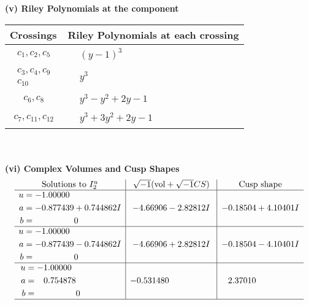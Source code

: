 \documentclass[1p]{elsarticle_modified}
\theoremstyle{definition}
\newcommand{\I}{\sqrt{-1}}
\begin{document}
\newpage\renewcommand{\arraystretch}{1}
\flushleft \textbf{(v) Riley Polynomials at the component}\newline \\
\begin{tabular}{m{50pt}|m{274pt}}
Crossings & \hspace{64pt}Riley Polynomials at each crossing \\
\hline $$\begin{aligned}c_{1},c_{2},c_{5}\end{aligned}$$&$\begin{aligned}
&(y-1)^3
\end{aligned}$\\
\hline $$\begin{aligned}c_{3},c_{4},c_{9}\\c_{10}\end{aligned}$$&$\begin{aligned}
&y^3
\end{aligned}$\\
\hline $$\begin{aligned}c_{6},c_{8}\end{aligned}$$&$\begin{aligned}
&y^3- y^2+2 y-1
\end{aligned}$\\
\hline $$\begin{aligned}c_{7},c_{11},c_{12}\end{aligned}$$&$\begin{aligned}
&y^3+3 y^2+2 y-1
\end{aligned}$\\
\hline
\end{tabular}\\~\\
\newpage\flushleft \textbf{(vi) Complex Volumes and Cusp Shapes}
$$\begin{array}{c|c|c}  
\text{Solutions to }I^u_{2}& \I (\text{vol} + \sqrt{-1}CS) & \text{Cusp shape}\\
 \hline 
\begin{aligned}
u &= -1.00000\phantom{ +0.000000I} \\
a &= -0.877439 + 0.744862 I \\
b &= \phantom{-0.000000 } 0\end{aligned}
 & -4.66906 - 2.82812 I & -0.18504 + 4.10401 I \\ \hline\begin{aligned}
u &= -1.00000\phantom{ +0.000000I} \\
a &= -0.877439 - 0.744862 I \\
b &= \phantom{-0.000000 } 0\end{aligned}
 & -4.66906 + 2.82812 I & -0.18504 - 4.10401 I \\ \hline\begin{aligned}
u &= -1.00000\phantom{ +0.000000I} \\
a &= \phantom{-}0.754878\phantom{ +0.000000I} \\
b &= \phantom{-0.000000 } 0\end{aligned}
 & -0.531480\phantom{ +0.000000I} & \phantom{-}2.37010\phantom{ +0.000000I}\\
 \hline 
 \end{array}$$\newpage\newpage\renewcommand{\arraystretch}{1}
\end{document}
